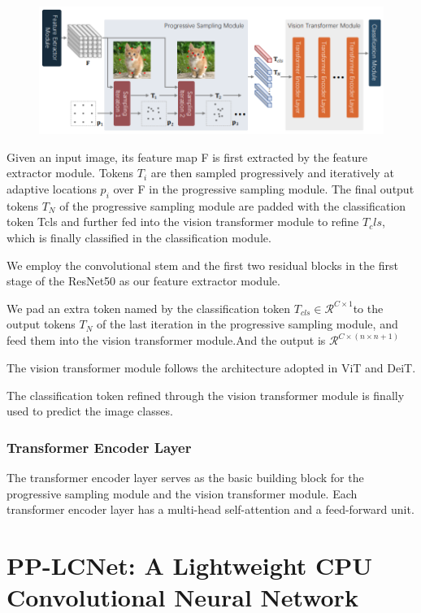 \documentclass[11pt]{article}
\begin{document}
\begin{figure}[h]
	\centering
	\includegraphics[scale = 0.7]{4}
\end{figure}
Given an input image, its feature map F is first extracted by the feature extractor module. Tokens $T_i$ are then sampled progressively and iteratively at adaptive locations $p_i$ over F in the progressive sampling module. The final output tokens $T_N$ of the progressive sampling module are padded with the classification token Tcls and further fed into the vision transformer module to refine $T_cls$, which is finally classified in the classification module.

We employ the convolutional stem and the first two residual blocks in the first stage of the ResNet50 as our feature extractor module.

We pad an extra token named by the classification token $T_{cls} \in \mathcal{R}^{C\times 1}$to the output tokens $T_N$ of the last iteration in the progressive sampling module, and feed them into the vision transformer module.And the output is $\mathcal{R}^{C\times (n\times n +1)}$

The vision transformer module follows the architecture adopted in ViT and DeiT.

The classification token refined through the vision transformer module is finally used to predict the image classes.
\subsubsection{Transformer Encoder Layer}
The transformer encoder layer serves as the basic building block for the progressive sampling module and the vision transformer module. Each transformer encoder layer has a multi-head self-attention and a feed-forward unit.

\section{PP-LCNet: A Lightweight CPU Convolutional Neural Network}
\end{document}
